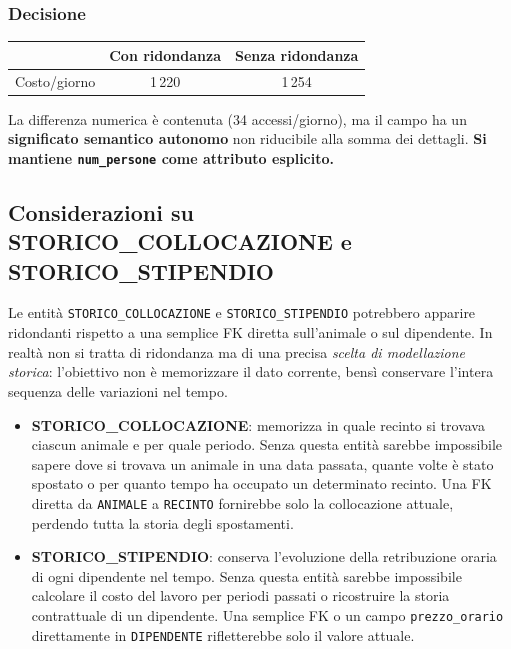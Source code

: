 \documentclass[12pt,a4paper]{report}
\begin{document}
\subsubsection*{Decisione}

\begin{center}
\begin{tabular}{lcc}
\toprule
 & \textbf{Con ridondanza} & \textbf{Senza ridondanza} \\
\midrule
Costo/giorno & 1\,220 & 1\,254 \\
\bottomrule
\end{tabular}
\end{center}

La differenza numerica è contenuta (34 accessi/giorno), ma il campo ha
un \textbf{significato semantico autonomo} non riducibile alla somma dei dettagli.
\textbf{Si mantiene \texttt{num\_persone} come attributo esplicito.}

\subsection*{Considerazioni su STORICO\_COLLOCAZIONE e STORICO\_STIPENDIO}

Le entità \texttt{STORICO\_COLLOCAZIONE} e \texttt{STORICO\_STIPENDIO} potrebbero
apparire ridondanti rispetto a una semplice FK diretta sull'animale o sul dipendente.
In realtà non si tratta di ridondanza ma di una precisa \emph{scelta di modellazione
storica}: l'obiettivo non è memorizzare il dato corrente, bensì conservare l'intera
sequenza delle variazioni nel tempo.

\begin{itemize}[itemsep=2pt]
  \item \textbf{STORICO\_COLLOCAZIONE}: memorizza in quale recinto si trovava ciascun
        animale e per quale periodo. Senza questa entità sarebbe impossibile sapere
        dove si trovava un animale in una data passata, quante volte è stato
        spostato o per quanto tempo ha occupato un determinato recinto. Una FK
        diretta da \texttt{ANIMALE} a \texttt{RECINTO} fornirebbe solo la collocazione
        attuale, perdendo tutta la storia degli spostamenti.

  \item \textbf{STORICO\_STIPENDIO}: conserva l'evoluzione della retribuzione oraria
        di ogni dipendente nel tempo. Senza questa entità sarebbe impossibile
        calcolare il costo del lavoro per periodi passati o ricostruire la storia
        contrattuale di un dipendente. Una semplice FK o un campo \texttt{prezzo\_orario}
        direttamente in \texttt{DIPENDENTE} rifletterebbe solo il valore attuale.
\end{itemize}
\end{document}
